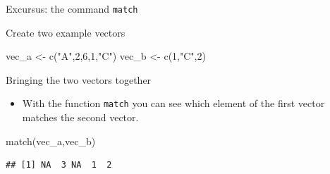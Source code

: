 \documentclass[
  10pt,
  ignorenonframetext,
]{beamer}
\newenvironment{Shaded}{\begin{snugshade}}{\end{snugshade}}
\newcommand{\DecValTok}[1]{\textcolor[rgb]{0.86,0.86,0.80}{#1}}
\newcommand{\KeywordTok}[1]{\textcolor[rgb]{0.94,0.87,0.69}{#1}}
\newcommand{\NormalTok}[1]{\textcolor[rgb]{0.80,0.80,0.80}{#1}}
\newcommand{\StringTok}[1]{\textcolor[rgb]{0.80,0.58,0.58}{#1}}
\providecommand{\tightlist}{%
  \setlength{\itemsep}{0pt}\setlength{\parskip}{0pt}}
\begin{document}
\begin{frame}[fragile]{Excursus: the command \texttt{match}}
\protect\hypertarget{excursus-the-command-match}{}

\begin{block}{Create two example vectors}

\begin{Shaded}
\begin{Highlighting}[]
\NormalTok{vec_a <-}\StringTok{ }\KeywordTok{c}\NormalTok{(}\StringTok{"A"}\NormalTok{,}\DecValTok{2}\NormalTok{,}\DecValTok{6}\NormalTok{,}\DecValTok{1}\NormalTok{,}\StringTok{"C"}\NormalTok{)}
\NormalTok{vec_b <-}\StringTok{ }\KeywordTok{c}\NormalTok{(}\DecValTok{1}\NormalTok{,}\StringTok{"C"}\NormalTok{,}\DecValTok{2}\NormalTok{)}
\end{Highlighting}
\end{Shaded}

\end{block}

\begin{block}{Bringing the two vectors together}

\begin{itemize}
\tightlist
\item
  With the function \texttt{match} you can see which element of the
  first vector matches the second vector.
\end{itemize}

\begin{Shaded}
\begin{Highlighting}[]
\KeywordTok{match}\NormalTok{(vec_a,vec_b)}
\end{Highlighting}
\end{Shaded}

\begin{verbatim}
## [1] NA  3 NA  1  2
\end{verbatim}

\end{block}

\end{frame}
\end{document}
